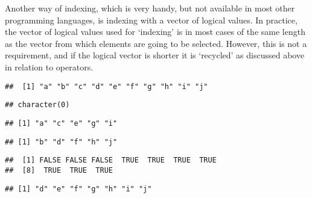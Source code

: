 \documentclass[paper=a4,10pt,div=17,headsepline,BCOR=12mm,twoside,open=right]{scrbook}\usepackage{knitr}
\begin{document}
Another way of indexing, which is very handy, but not available in most other programming languages, is indexing with a vector of logical values. In practice, the vector of logical values used for `indexing' is in most cases of the same length as the vector from which elements are going to be selected. However, this is not a requirement, and if the logical vector is shorter it is `recycled' as discussed above in relation to operators.

\begin{knitrout}\footnotesize
{}\color{fgcolor}\begin{kframe}
\begin{alltt}
\hlstd{a[}\hlstd{]}
\end{alltt}
\begin{verbatim}
##  [1] "a" "b" "c" "d" "e" "f" "g" "h" "i" "j"
\end{verbatim}
\begin{alltt}
\hlstd{a[}\hlstd{]}
\end{alltt}
\begin{verbatim}
## character(0)
\end{verbatim}
\begin{alltt}
\hlstd{a[}\hlstd{(}\hlstd{,} \hlstd{)]}
\end{alltt}
\begin{verbatim}
## [1] "a" "c" "e" "g" "i"
\end{verbatim}
\begin{alltt}
\hlstd{a[}\hlstd{(}\hlstd{,} \hlstd{)]}
\end{alltt}
\begin{verbatim}
## [1] "b" "d" "f" "h" "j"
\end{verbatim}
\begin{alltt}
 \hlopt{>} 
\end{alltt}
\begin{verbatim}
##  [1] FALSE FALSE FALSE  TRUE  TRUE  TRUE  TRUE
##  [8]  TRUE  TRUE  TRUE
\end{verbatim}
\begin{alltt}
\hlstd{a[a} \hlopt{>} \hlstd{]}
\end{alltt}
\begin{verbatim}
## [1] "d" "e" "f" "g" "h" "i" "j"
\end{verbatim}
\begin{alltt}
 \hlkwb{<-}  \hlopt{>} 

\end{alltt}
\end{kframe}
\end{knitrout}
\end{document}
